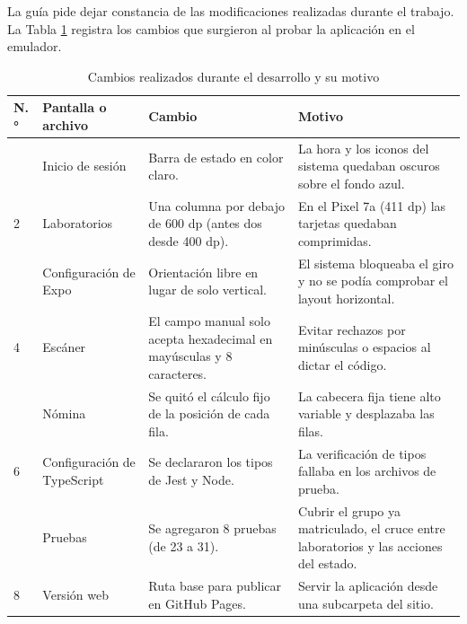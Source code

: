 \vspace{0.2cm}

La guía pide dejar constancia de las modificaciones realizadas durante el trabajo. La Tabla \ref{tab:cambios} registra los cambios que surgieron al probar la aplicación en el emulador.

\begin{table}[H]
\centering\footnotesize
\caption{Cambios realizados durante el desarrollo y su motivo}\label{tab:cambios}
\renewcommand{\arraystretch}{1.25}
\begin{tabular}{|>{\raggedright\arraybackslash}p{}|>{\raggedright\arraybackslash}p{}|>{\raggedright\arraybackslash}p{}|>{\raggedright\arraybackslash}p{}|}
\hline
\rowcolor{colabpyblue} \color{white}\textbf{N.°} & \color{white}\textbf{Pantalla o archivo} & \color{white}\textbf{Cambio} & \color{white}\textbf{Motivo} \\ \hline
1 & Inicio de sesión & Barra de estado en color claro. & La hora y los iconos del sistema quedaban oscuros sobre el fondo azul. \\ \hline
\rowcolor{colabpybg} 2 & Laboratorios & Una columna por debajo de 600 dp (antes dos desde 400 dp). & En el Pixel 7a (411 dp) las tarjetas quedaban comprimidas. \\ \hline
3 & Configuración de Expo & Orientación libre en lugar de solo vertical. & El sistema bloqueaba el giro y no se podía comprobar el layout horizontal. \\ \hline
\rowcolor{colabpybg} 4 & Escáner & El campo manual solo acepta hexadecimal en mayúsculas y 8 caracteres. & Evitar rechazos por minúsculas o espacios al dictar el código. \\ \hline
5 & Nómina & Se quitó el cálculo fijo de la posición de cada fila. & La cabecera fija tiene alto variable y desplazaba las filas. \\ \hline
\rowcolor{colabpybg} 6 & Configuración de TypeScript & Se declararon los tipos de Jest y Node. & La verificación de tipos fallaba en los archivos de prueba. \\ \hline
7 & Pruebas & Se agregaron 8 pruebas (de 23 a 31). & Cubrir el grupo ya matriculado, el cruce entre laboratorios y las acciones del estado. \\ \hline
\rowcolor{colabpybg} 8 & Versión web & Ruta base para publicar en GitHub Pages. & Servir la aplicación desde una subcarpeta del sitio. \\ \hline
\end{tabular}
\end{table}

